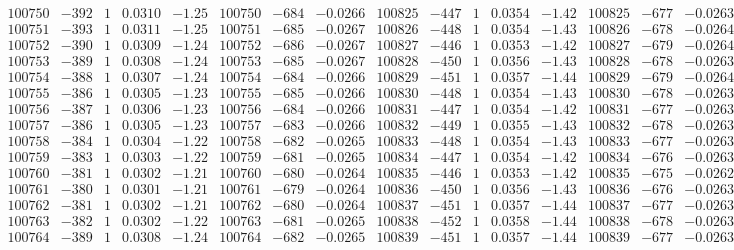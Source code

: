 \documentclass[11pt,reqno,a4letter]{article}
\numberwithin{figure}{section}
\numberwithin{table}{section}
\theoremstyle{plain}
\numberwithin{theorem}{section}
\theoremstyle{definition}
\begin{document}
\begin{table}[ht!]
\begin{equation*}
{\begin{array}{ccccc|ccc||ccccc|ccc}
100750 & -392 & 1 & 0.0310 & -1.25 & 100750 & -684 & -0.0266 & 100825 & -447 & 1 & 0.0354 & -1.42 & 100825 & -677 & -0.0263  \\
100751 & -393 & 1 & 0.0311 & -1.25 & 100751 & -685 & -0.0267 & 100826 & -448 & 1 & 0.0354 & -1.43 & 100826 & -678 & -0.0264  \\
100752 & -390 & 1 & 0.0309 & -1.24 & 100752 & -686 & -0.0267 & 100827 & -446 & 1 & 0.0353 & -1.42 & 100827 & -679 & -0.0264  \\
100753 & -389 & 1 & 0.0308 & -1.24 & 100753 & -685 & -0.0267 & 100828 & -450 & 1 & 0.0356 & -1.43 & 100828 & -678 & -0.0263  \\
100754 & -388 & 1 & 0.0307 & -1.24 & 100754 & -684 & -0.0266 & 100829 & -451 & 1 & 0.0357 & -1.44 & 100829 & -679 & -0.0264  \\
100755 & -386 & 1 & 0.0305 & -1.23 & 100755 & -685 & -0.0266 & 100830 & -448 & 1 & 0.0354 & -1.43 & 100830 & -678 & -0.0263  \\
100756 & -387 & 1 & 0.0306 & -1.23 & 100756 & -684 & -0.0266 & 100831 & -447 & 1 & 0.0354 & -1.42 & 100831 & -677 & -0.0263  \\
100757 & -386 & 1 & 0.0305 & -1.23 & 100757 & -683 & -0.0266 & 100832 & -449 & 1 & 0.0355 & -1.43 & 100832 & -678 & -0.0263  \\
100758 & -384 & 1 & 0.0304 & -1.22 & 100758 & -682 & -0.0265 & 100833 & -448 & 1 & 0.0354 & -1.43 & 100833 & -677 & -0.0263  \\
100759 & -383 & 1 & 0.0303 & -1.22 & 100759 & -681 & -0.0265 & 100834 & -447 & 1 & 0.0354 & -1.42 & 100834 & -676 & -0.0263  \\
100760 & -381 & 1 & 0.0302 & -1.21 & 100760 & -680 & -0.0264 & 100835 & -446 & 1 & 0.0353 & -1.42 & 100835 & -675 & -0.0262  \\
100761 & -380 & 1 & 0.0301 & -1.21 & 100761 & -679 & -0.0264 & 100836 & -450 & 1 & 0.0356 & -1.43 & 100836 & -676 & -0.0263  \\
100762 & -381 & 1 & 0.0302 & -1.21 & 100762 & -680 & -0.0264 & 100837 & -451 & 1 & 0.0357 & -1.44 & 100837 & -677 & -0.0263  \\
100763 & -382 & 1 & 0.0302 & -1.22 & 100763 & -681 & -0.0265 & 100838 & -452 & 1 & 0.0358 & -1.44 & 100838 & -678 & -0.0263  \\
100764 & -389 & 1 & 0.0308 & -1.24 & 100764 & -682 & -0.0265 & 100839 & -451 & 1 & 0.0357 & -1.44 & 100839 & -677 & -0.0263  \\
\end{array}
}
\end{equation*} 

\end{table}
\clearpage 
\end{document}
